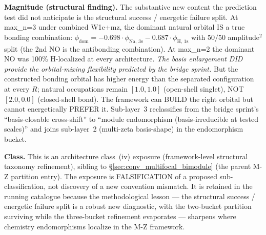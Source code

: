 \documentclass[11pt]{article}
\begin{document}
\textbf{Magnitude (structural finding).} The substantive new content
the prediction test did not anticipate is the structural success /
energetic failure split. At max\_n=3 under combined W1c+mz, the
dominant natural orbital IS a true bonding combination:
$\phi_\text{dom} = -0.698 \cdot \phi_\text{Na, 3s} - 0.687 \cdot
\phi_\text{H, 1s}$ with $50/50$ amplitude$^2$ split (the 2nd NO is the
antibonding combination). At max\_n=2 the dominant NO was 100\%
H-localized at every architecture. \emph{The basis enlargement DID
provide the orbital-mixing flexibility predicted by the bridge sprint.}
But the constructed bonding orbital has higher energy than the separated
configuration at every $R$; natural occupations remain $[1.0, 1.0]$
(open-shell singlet), NOT $[2.0, 0.0]$ (closed-shell bond). The
framework can BUILD the right orbital but cannot energetically PREFER
it. Sub-layer~3 reclassifies from the bridge sprint's ``basis-closable
cross-shift'' to ``module endomorphism (basis-irreducible at tested
scales)'' and joins sub-layer~2 (multi-zeta basis-shape) in the
endomorphism bucket.

\textbf{Class.} This is an architecture class~(iv) exposure
(framework-level structural taxonomy refinement), sibling to
\S\ref{sec:conv_multifocal_bimodule} (the parent M-Z partition entry).
The exposure is FALSIFICATION of a proposed sub-classification, not
discovery of a new convention mismatch. It is retained in the running
catalogue because the methodological lesson --- the structural
success / energetic failure split is a robust new diagnostic, with
the two-bucket partition surviving while the three-bucket refinement
evaporates --- sharpens where chemistry endomorphisms localize in the
M-Z framework.
\end{document}
